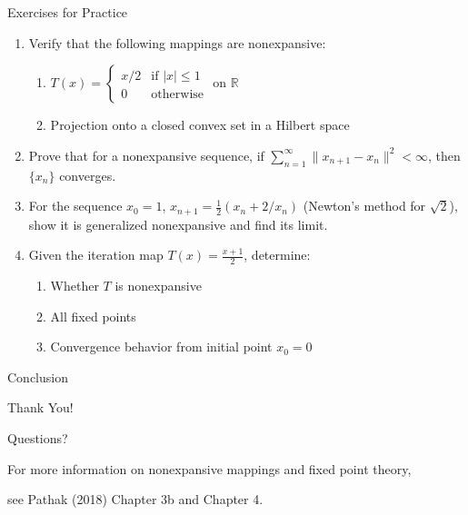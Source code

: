\documentclass[aspectratio=169,10pt]{beamer}
\begin{document}
\begin{frame}{Exercises for Practice}
    \begin{enumerate}
        \item Verify that the following mappings are nonexpansive:
            \begin{enumerate}
                \item $T(x) = \begin{cases} x/2 & \text{if } |x| \leq 1 \\ 0 & \text{otherwise} \end{cases}$ on $\mathbb{R}$

                \item Projection onto a closed convex set in a Hilbert space
            \end{enumerate}

        \item Prove that for a nonexpansive sequence, if $\sum_{n=1}^{\infty} \|x_{n+1} - x_n\|^2 < \infty$, then $\{x_n\}$ converges.

        \item For the sequence $x_0 = 1$, $x_{n+1} = \frac{1}{2}(x_n + 2/x_n)$ (Newton's method for $\sqrt{2}$), show it is generalized nonexpansive and find its limit.

        \item Given the iteration map $T(x) = \frac{x + 1}{2}$, determine:
            \begin{enumerate}
                \item Whether $T$ is nonexpansive
                \item All fixed points
                \item Convergence behavior from initial point $x_0 = 0$
            \end{enumerate}
    \end{enumerate}
\end{frame}

\begin{frame}{Conclusion}
    \begin{center}
        \vspace{1cm}
        {\Huge Thank You!}

        \vspace{0.8cm}

        {\Large Questions?}

        \vspace{0.8cm}

        {\small For more information on nonexpansive mappings and fixed point theory,}

        {\small see Pathak (2018) Chapter 3b and Chapter 4.}
    \end{center}
\end{frame}
\end{document}
